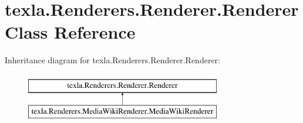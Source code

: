 \hypertarget{classtexla_1_1Renderers_1_1Renderer_1_1Renderer}{}\section{texla.\+Renderers.\+Renderer.\+Renderer Class Reference}
\label{classtexla_1_1Renderers_1_1Renderer_1_1Renderer}
Inheritance diagram for texla.\+Renderers.\+Renderer.\+Renderer\+:\begin{figure}[H]
\begin{center}
\leavevmode
\includegraphics[height=2.000000cm]{classtexla_1_1Renderers_1_1Renderer_1_1Renderer}
\end{center}
\end{figure}
